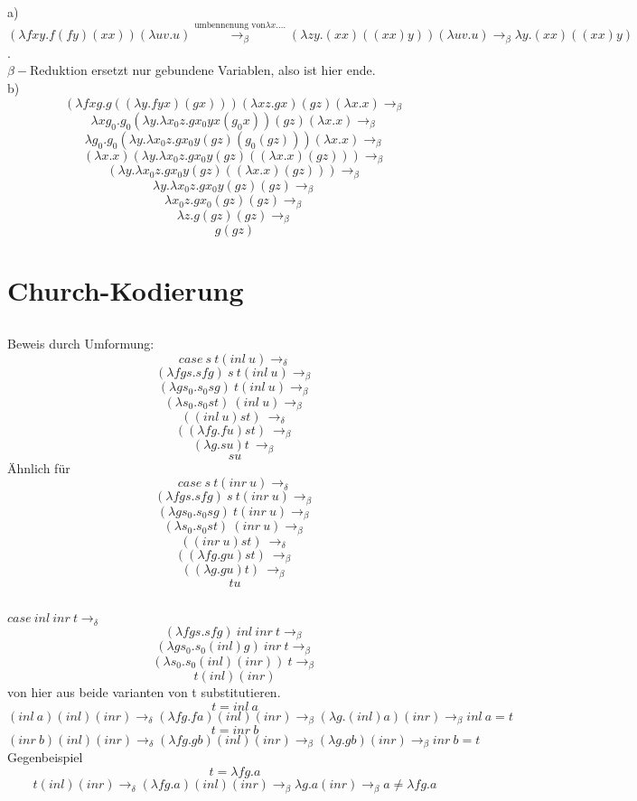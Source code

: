 \documentclass{article}
\begin{document}
	\subsubsection{}
	a) $(\lambda fxy.f(fy)(xx))(\lambda uv.u)\stackrel{\text{umbennenung von} \lambda x.\dots}{\to_\beta} (\lambda zy.(xx)((xx)y))(\lambda uv.u)\to_\beta \lambda y.(xx)((xx)y)$.\\
	$\beta-$Reduktion ersetzt nur gebundene Variablen, also ist hier ende.\\
	b)$$(\lambda fxg.g((\lambda y.fyx)(gx))) (\lambda xz.gx)(gz)(\lambda x.x)\to_\beta $$
	$$\lambda xg_0.g_0(\lambda y.\lambda x_0z.gx_0yx(g_0x)) (gz)(\lambda x.x)\to_\beta $$
	$$\lambda g_0.g_0(\lambda y.\lambda x_0z.gx_0y(gz)(g_0(gz))) (\lambda x.x)\to_\beta $$
	$$(\lambda x.x)(\lambda y.\lambda x_0z.gx_0y(gz)((\lambda x.x)(gz))) \to_\beta $$
	$$(\lambda y.\lambda x_0z.gx_0y(gz)((\lambda x.x)(gz))) \to_\beta $$
	$$\lambda y.\lambda x_0z.gx_0y(gz)(gz) \to_\beta $$
	$$\lambda x_0z.gx_0(gz)(gz) \to_\beta $$
	$$\lambda z.g(gz)(gz) \to_\beta $$
	$$g(gz)$$
	\section{Church-Kodierung}
	\subsection{}
	Beweis durch Umformung:\\
	$$case\ s\ t (inl\ u)\to_{\delta}$$
	$$(\lambda fgs.sfg)\ s\ t (inl\ u)\to_{\beta}$$
	$$(\lambda gs_0.s_0sg)\ t (inl\ u)\to_{\beta}$$
	$$(\lambda s_0.s_0st)\ (inl\ u)\to_{\beta}$$
	$$((inl\ u)st)\ \to_{\delta}$$
	$$((\lambda fg.fu)st)\ \to_{\beta}$$
	$$(\lambda g.su)t\ \to_{\beta}$$
	$$su$$
	Ähnlich für 
	$$case\ s\ t (inr\ u)\to_{\delta}$$
	$$(\lambda fgs.sfg)\ s\ t (inr\ u)\to_{\beta}$$
	$$(\lambda gs_0.s_0sg)\ t (inr\ u)\to_{\beta}$$
	$$(\lambda s_0.s_0st)\ (inr\ u)\to_{\beta}$$
	$$((inr\ u)st)\ \to_{\delta}$$
	$$((\lambda fg.gu)st)\ \to_{\beta}$$
	$$((\lambda g.gu)t)\ \to_{\beta}$$
	$$tu$$
	\subsection{}
	$case\ inl\ inr\ t\to_{\delta}$
	$$(\lambda fgs.sfg)\ inl\ inr \ t \to_{\beta}$$
	$$(\lambda gs_0.s_0(inl)g)\ inr \ t\to_{\beta}$$
	$$(\lambda s_0.s_0(inl)( inr))\  t\to_{\beta}$$
	$$t(inl)( inr)$$
	von hier aus beide varianten von t substitutieren.\\
	$$t=inl\ a$$
	$$(inl\ a)(inl)( inr)\to_{\delta}(\lambda fg.fa)(inl)( inr)\to_\beta (\lambda g.(inl)a)( inr)\to_\beta inl\ a=t$$
	$$t=inr\ b$$
	$$(inr\ b)(inl)( inr)\to_{\delta}(\lambda fg.gb)(inl)( inr)\to_\beta (\lambda g.gb)( inr)\to_\beta inr\ b=t$$
	Gegenbeispiel\\
	$$t=\lambda fg.a$$
	$$t(inl)( inr)\to_\delta (\lambda fg.a)(inl)( inr)\to_\beta \lambda g.a(inr)\to_\beta a\neq \lambda fg.a$$
\end{document}

